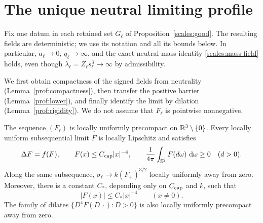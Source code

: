 \section{The unique neutral limiting profile}
\label{prof:section}

Fix one datum in each retained set $G_\ell$ of
Proposition~\ref{scales:good}.  The resulting fields are deterministic;
we use its notation and all its bounds below.  In particular,
$a_\ell\to0$, $q_\ell\to\infty$, and the exact neutral mass identity
\eqref{scales:mass-field} holds, even though
$\lambda_\ell=Z_\ell s_\ell^3\to\infty$ by admissibility.

We first obtain compactness of the signed fields from neutrality
(Lemma~\ref{prof:compactness}), then transfer the positive barrier
(Lemma~\ref{prof:lower}), and finally identify the limit by dilation
(Lemma~\ref{prof:rigidity}).
We do not assume that $F_\ell$ is pointwise nonnegative.

\begin{lemma}
\label{prof:compactness}
The sequence $(F_\ell)$ is locally uniformly precompact on
$\mathbb R^3\setminus\{0\}$.  Every locally uniform subsequential limit $F$
is locally Lipschitz and satisfies
\begin{equation}
\label{prof:limit-equation}
 \Delta F=f(F),\qquad F(x)\le C_{\rm cap}|x|^{-4},\qquad
 \frac1{4\pi}\int_{\mathbb S^2}F(d\omega)\,\,\mathrm d\omega\ge0
 \quad(d>0).
\end{equation}
Along the same subsequence,
$\sigma_\ell\to k(F_+)^{3/2}$ locally uniformly away from zero.
Moreover, there is a constant $C_*$, depending only on $C_{\rm cap}$
and $k$, such that
\begin{equation}
\label{prof:absolute}
 |F(x)|\le C_*|x|^{-4}\qquad(x\ne0).
\end{equation}
The family of dilates $\{D^4F(D\,\cdot):D>0\}$ is also locally
uniformly precompact away from zero.
\end{lemma}


